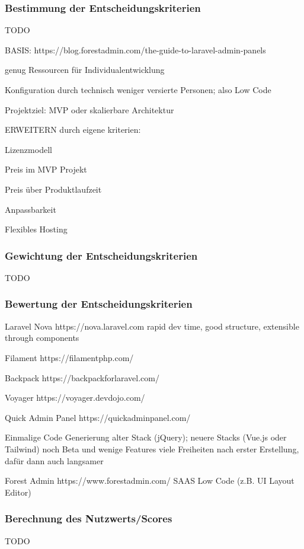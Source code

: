 \subsubsection{Bestimmung der Entscheidungskriterien}
TODO

BASIS: https://blog.forestadmin.com/the-guide-to-laravel-admin-panels

genug Ressourcen für Individualentwicklung

Konfiguration durch technisch weniger versierte Personen; also Low Code

Projektziel: MVP oder skalierbare Architektur

ERWEITERN durch eigene kriterien:

Lizenzmodell

Preis im MVP Projekt

Preis über Produktlaufzeit

Anpassbarkeit

Flexibles Hosting

\subsubsection{Gewichtung der Entscheidungskriterien}
TODO

\subsubsection{Bewertung der Entscheidungskriterien}
Laravel Nova
https://nova.laravel.com
rapid dev time, good structure, extensible through components

Filament
https://filamentphp.com/

Backpack
https://backpackforlaravel.com/

Voyager
https://voyager.devdojo.com/

Quick Admin Panel
https://quickadminpanel.com/

Einmalige Code Generierung
alter Stack (jQuery); neuere Stacks (Vue.js oder Tailwind) noch Beta und wenige Features
viele Freiheiten nach erster Erstellung, dafür dann auch langsamer

Forest Admin
https://www.forestadmin.com/
SAAS
Low Code (z.B. UI Layout Editor)

\subsubsection{Berechnung des Nutzwerts/Scores}
TODO
